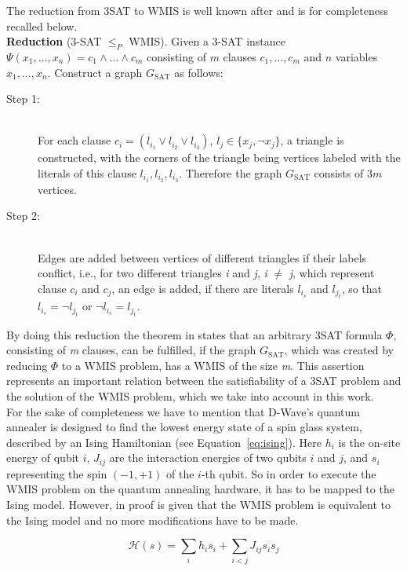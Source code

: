 The reduction from 3SAT to WMIS is well known after \cite{choi2010adiabatic} and is for completeness recalled below.\\

\textbf{Reduction} (3-SAT $\leq_ {P}$ WMIS).
Given a 3-SAT instance $\Psi(x_{1}, \dots, x_{n}) = c_{1} \wedge ... \wedge c_{m}$ consisting of $m$ clauses \emph{$c_{1}, ..., c_{m}$} and $n$ variables $x_1, ..., x_n$. Construct a graph $G_{\text{SAT}}$ as follows:
\begin{description}
	\item[Step 1:]\hfill \\
	For each clause $c_{i} = (l_{i_{1}} \vee l_{i_{2}} \vee l_{i_{3}})$, $l_{j} \in \{x_{j}, \lnot x_{j}\}$, a triangle is constructed, with the corners of the triangle being vertices labeled with the literals of this clause $l_{i_{1}}, l_{i_{2}}, l_{i_{3}}$. Therefore the graph $G_{\text{SAT}}$ consists of $3m$ vertices.
	\item[Step 2:]\hfill \\
	Edges are added between vertices of different triangles if their labels conflict, i.e., for two different triangles \emph{i} and \emph{j}, \emph{i} $\neq$ \emph{j}, which represent clause $c_i$ and $c_j$, an edge is added, if there are literals $l_{i_{s}}$ and $l_{j_{t}}$, so that $l_{i_{s}} = \lnot l_{j_{t}}$ or $\lnot l_{i_{s}} = l_{j_{t}}$.
\end{description}

By doing this reduction the theorem in \cite{choi2010adiabatic} states that an arbitrary 3SAT formula $\Phi$, consisting of \emph{m} clauses, can be fulfilled, if the graph $G_{\text{SAT}}$, which was created by reducing $\Phi$ to a WMIS problem, has a WMIS of the size \emph{m}. 
This assertion represents an important relation between the satisfiability of a 3SAT problem and the solution of the WMIS problem, which we take into account in this work.\\

For the sake of completeness we have to mention that D-Wave's quantum annealer is designed to find the lowest energy state of a spin glass system, described by an Ising Hamiltonian (see Equation~\ref{eq:ising}). Here $ h_{i}$ is the on-site energy of qubit $i$, $J_{ij}$ are the interaction energies of two qubits $i$ and $j$, and $s_{i}$ representing the spin $(-1, +1)$ of the $i$-th qubit. So in order to execute the WMIS problem on the quantum annealing hardware, it has to be mapped to the Ising model. However, in \cite{choi2008minor} proof is given that the WMIS problem is equivalent to the Ising model and no more modifications have to be made.

\begin{equation}\label{eq:ising}
	\mathcal{H}(s) = \sum_{i} h_{i}s_{i} + \sum_{i<j} J_{ij}s_{i}s_{j}
\end{equation}
